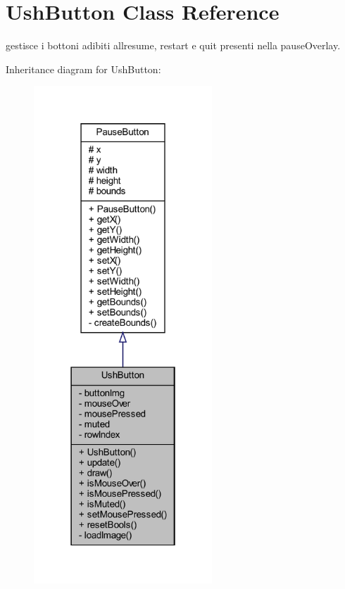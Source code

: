 \hypertarget{classui_1_1_ush_button}{}\section{Ush\+Button Class Reference}
\label{classui_1_1_ush_button}


gestisce i bottoni adibiti all\textquotesingle{}resume, restart e quit presenti nella pause\+Overlay.  




Inheritance diagram for Ush\+Button\+:\nopagebreak
\begin{figure}[H]
\begin{center}
\leavevmode
\includegraphics[width=190pt]{classui_1_1_ush_button__inherit__graph}
\end{center}
\end{figure}


